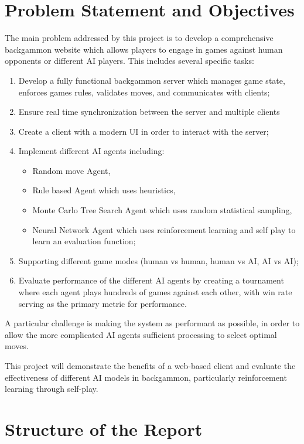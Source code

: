 \section{Problem Statement and Objectives}
The main problem addressed by this project is to develop a comprehensive backgammon website which allows players to engage in games against human opponents or different AI players. This includes several specific tasks:
\begin{enumerate}
    \item Develop a fully functional backgammon server which manages game state, enforces games rules, validates moves, and communicates with clients;
    \item Ensure real time synchronization between the server and multiple clients
    \item Create a client with a modern UI in order to interact with the server;
    \item Implement different AI agents including:
    \begin{itemize}
        \item Random move Agent,
        \item Rule based Agent which uses heuristics,
        \item Monte Carlo Tree Search Agent which uses random statistical sampling,
        \item Neural Network Agent which uses reinforcement learning and self play to learn an evaluation function;
    \end{itemize}
    \item Supporting different game modes (human vs human, human vs AI, AI vs AI);
    \item Evaluate performance of the different AI agents by creating a tournament where each agent plays hundreds of games against each other, with win rate serving as the primary metric for performance.
\end{enumerate}

A particular challenge is making the system as performant as possible, in order to allow the more complicated AI agents sufficient processing to select optimal moves.

This project will demonstrate the benefits of a web-based client and evaluate the effectiveness of different AI models in backgammon, particularly reinforcement learning through self-play.

\section{Structure of the Report}




